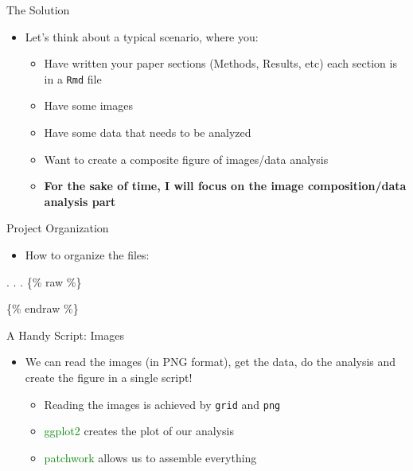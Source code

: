\documentclass[
  ignorenonframetext,
]{beamer}
\providecommand{\tightlist}{%
  \setlength{\itemsep}{0pt}\setlength{\parskip}{0pt}}\usepackage{longtable,booktabs,array}
\begin{document}
\begin{frame}[fragile]{The Solution}
\protect\hypertarget{the-solution-2}{}
\begin{itemize}[<+->]
\tightlist
\item
  Let's think about a typical scenario, where you:

  \begin{itemize}[<+->]
  \item
    Have written your paper sections (Methods, Results, etc) each
    section is in a \texttt{Rmd} file
  \item
    Have some images
  \item
    Have some data that needs to be analyzed
  \item
    Want to create a composite figure of images/data analysis
  \item
    \textbf{For the sake of time, I will focus on the image
    composition/data analysis part}
  \end{itemize}
\end{itemize}
\end{frame}

\begin{frame}{Project Organization}
\protect\hypertarget{project-organization}{}
\begin{itemize}[<+->]
\tightlist
\item
  How to organize the files:
\end{itemize}

. . . \{\% raw \%\}


\{\% endraw \%\}
\end{frame}

\begin{frame}[fragile]{A Handy Script: Images}
\protect\hypertarget{a-handy-script-images}{}
\begin{itemize}[<+->]
\tightlist
\item
  We can read the images (in PNG format), get the data, do the analysis
  and create the figure in a single script!

  \begin{itemize}[<+->]
  \tightlist
  \item
    Reading the images is achieved by \texttt{grid} and \texttt{png}
  \item
    \textcolor{green}{{ggplot2}} creates the plot of our analysis
  \item
    \textcolor{green}{{patchwork}} allows us to assemble everything
  \end{itemize}
\end{itemize}
\end{frame}
\end{document}
